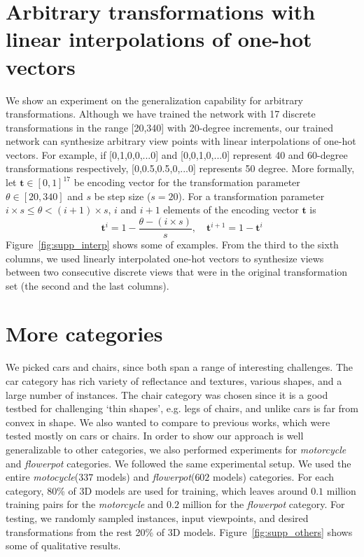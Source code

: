\documentclass[10pt,twocolumn,letterpaper]{article}
\begin{document}
\section{Arbitrary transformations with linear interpolations of one-hot vectors}
We show an experiment on the generalization capability for arbitrary transformations. Although we have trained the network with 17 discrete transformations in the range [20,340] with 20-degree increments, our trained network can synthesize arbitrary view points with linear interpolations of one-hot vectors. For example, if [0,1,0,0,...0] and [0,0,1,0,...0] represent 40 and 60-degree transformations respectively, [0,0.5,0.5,0,...0] represents 50 degree. More formally, let $\mathbf{t} \in [0,1]^{17}$ be encoding vector for the transformation parameter $\theta \in [20,340]$ and $s$ be step size ($s = 20$). For a transformation parameter $i \times s \leq \theta < (i+1) \times s$, $i$ and $i+1$ elements of the encoding vector $\mathbf{t}$ is
\begin{equation}
\mathbf{t}^i = 1 - \frac{\theta - (i \times s)}{s}, \quad \mathbf{t}^{i+1} = 1 - \mathbf{t}^i
\end{equation}
Figure~\ref{fig:supp_interp} shows some of examples. From the third to the sixth columns, we used linearly interpolated one-hot vectors to synthesize views between two consecutive discrete views that were in the original transformation set (the second and the last columns).

\section{More categories}
We picked cars and chairs, since both span a range of interesting challenges.  The car category has rich variety of reflectance and textures, various shapes, and a large number of instances. The chair category was chosen since it is a good testbed for challenging `thin shapes', e.g. legs of chairs, and unlike cars is far from convex in shape. We also wanted to compare to previous works, which were tested mostly on cars or chairs. In order to show our approach is well generalizable to other categories, we also performed experiments for \emph{motorcycle} and \emph{flowerpot} categories. We followed the same experimental setup. We used the entire \emph{motocycle}($337$ models) and \emph{flowerpot}($602$ models) categories. For each category, 80\% of 3D models are used for training, which leaves around $0.1$ million training pairs for the \emph{motorcycle} and $0.2$ million for the \emph{flowerpot} category. For testing, we randomly sampled instances, input viewpoints, and desired transformations from the rest 20\% of 3D models. Figure~\ref{fig:supp_others} shows some of qualitative results.
\end{document}
